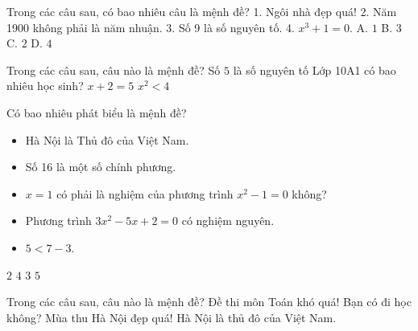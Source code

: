 \begin{ex}Trong các câu sau, có bao nhiêu câu là mệnh đề?
1. Ngôi nhà đẹp quá!
2. Năm 1900 không phải là năm nhuận.
3. Số 9 là số nguyên tố.
4. $x^3+1=0$.
\choice
{A. $1$}
{B. $3$}
{\True C. $2$}
{D. $4$}
\end{ex}

\begin{ex}%
Trong các câu sau, câu nào là mệnh đề?
\choice
{\True Số $5$ là số nguyên tố}
{Lớp 10A1 có bao nhiêu học sinh?}
{$x+2=5$}
{$x^2 {<} 4$}
\end{ex}

\begin{ex}
Có bao nhiêu phát biểu là mệnh đề?
\begin{itemize}
\item Hà Nội là Thủ đô của Việt Nam.
\item Số 16 là một số chính phương.
\item $x=1$ có phải là nghiệm của phương trình $x^2-1=0$ không?
\item Phương trình $3x^2-5x+2=0$ có nghiệm nguyên.
\item $5{<}7-3$.
\end{itemize}
\choice
{$2$}
{\True $4$}
{$3$}
{$5$}
\end{ex}

\begin{ex}
Trong các câu sau, câu nào là mệnh đề?
\def\dotEX{}%
\choice
{Đề thi môn Toán khó quá!}
{Bạn có đi học không?}
{Mùa thu Hà Nội đẹp quá!}
{\True Hà Nội là thủ đô của Việt Nam.}
\end{ex}

